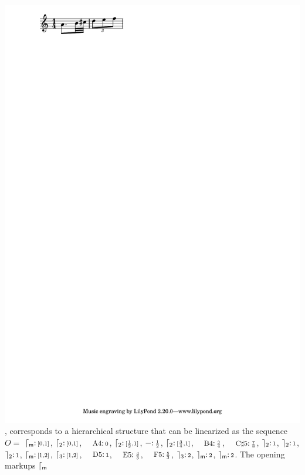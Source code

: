\begin{example}
\includegraphics[scale=0.35,trim=0 5mm 0 0]{pictures/ex1.pdf},
corresponds to a hierarchical structure
that can be linearized as the sequence
$O =$
$\lceil_{\mathsf{m}}\mathpunct{:}{\scriptstyle [0,1]}$,
$\lceil_{2}\mathpunct{:}{\scriptstyle [0,1]}$,
$\mbox{\footnotesize A4}\tstamp{0}$,
$\lceil_{2}\mathpunct{:}{\scriptstyle [\frac{1}{2},1]}$,
$-\mathpunct{:}{\scriptstyle \frac{1}{2}}$,
$\lceil_{2}\mathpunct{:}{\scriptstyle [\frac{3}{4},1]}$,
$\mbox{\footnotesize B4}\tstamp{\frac{3}{4}}$,
$\mbox{\footnotesize C$\sharp$5}\tstamp{\frac{7}{8}}$,
$\rceil_{2}\mathpunct{:}{\scriptstyle 1}$,
$\rceil_{2}\mathpunct{:}{\scriptstyle 1}$,
$\rceil_{2}\mathpunct{:}{\scriptstyle 1}$,
$\lceil_{\mathsf{m}}\mathpunct{:}{\scriptstyle [1,2]}$,
$\lceil_{3}\mathpunct{:}{\scriptstyle [1,2]}$,
$\mbox{\footnotesize D5}\tstamp{1}$,
$\mbox{\footnotesize E5}\tstamp{\frac{4}{3}}$,
$\mbox{\footnotesize F5}\tstamp{\frac{5}{3}}$,
$\rceil_{3}\mathpunct{:}{\scriptstyle 2}$,
$\rceil_{\mathsf{m}}\mathpunct{:}{\scriptstyle 2}$,
$\rceil_{\mathsf{m}}\mathpunct{:}{\scriptstyle 2}$.
The opening markups $\lceil_{\mathsf{m}}$ %

\end{example}
